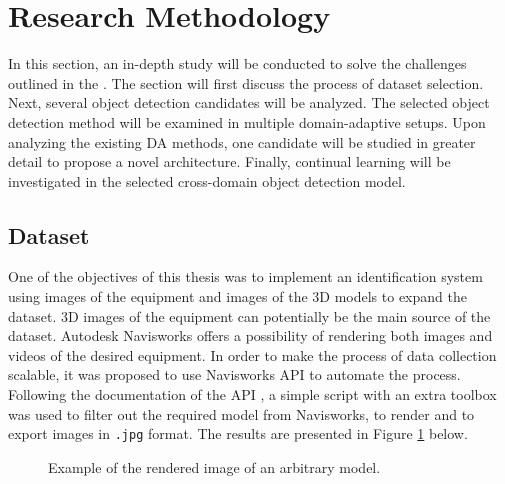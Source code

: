 \section{Research Methodology}
\label{Methodology}

In this section, an in-depth study will be conducted to solve the challenges outlined in the . The section will first discuss the process of dataset selection. Next, several object detection candidates will be analyzed.  The selected object detection method will be examined in multiple domain-adaptive setups. Upon analyzing the existing DA methods, one candidate will be studied in greater detail to propose a novel architecture. Finally, continual learning will be investigated in the selected cross-domain object detection model. 


\subsection{Dataset}
\label{datasets} 
One of the objectives of this thesis was to implement an identification system using images of the equipment and images of the 3D models to expand the dataset. 3D images of the equipment can potentially be the main source of the dataset. Autodesk Navisworks offers a possibility of rendering both images and videos of the desired equipment. In order to make the process of data collection scalable, it was proposed to use Navisworks API to automate the process. Following the documentation of the API  \cite{navisworks}, a simple script with an extra toolbox was used to filter out the required model from Navisworks, to render and to export images in \texttt{.jpg} format. The results are presented in Figure \ref{navisworks} below.

\begin{figure}[htb]
    \centering
    \qquad
    \caption{Example of the rendered image of an arbitrary model.}\label{navisworks}%
\end{figure}

